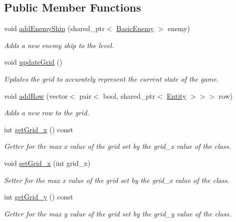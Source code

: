 \subsection*{Public Member Functions}
\begin{DoxyCompactItemize}
\item 
void \hyperlink{classGameLogic_1_1Level_a4d6e8cd499b0d78a36f7a2f89f221456}{add\+Enemy\+Ship} (shared\+\_\+ptr$<$ \hyperlink{classGameLogic_1_1BasicEnemy}{Basic\+Enemy} $>$ enemy)
\begin{DoxyCompactList}\small\item\em Adds a new enemy ship to the level. \end{DoxyCompactList}\item 
void \hyperlink{classGameLogic_1_1Level_a0d3d5db9311e281b7161c4daff692249}{update\+Grid} ()
\begin{DoxyCompactList}\small\item\em Updates the grid to accurately represent the current state of the game. \end{DoxyCompactList}\item 
void \hyperlink{classGameLogic_1_1Level_a42e42fda28e7f43286d9beb166d1e3f9}{add\+Row} (vector$<$ pair$<$ bool, shared\+\_\+ptr$<$ \hyperlink{classGameLogic_1_1Entity}{Entity} $>$$>$$>$ row)
\begin{DoxyCompactList}\small\item\em Adds a new row to the grid. \end{DoxyCompactList}\item 
int \hyperlink{classGameLogic_1_1Level_a3c233a241cf2ea7a231186acf2301ec3}{get\+Grid\+\_\+x} () const
\begin{DoxyCompactList}\small\item\em Getter for the max x value of the grid set by the grid\+\_\+x value of the class. \end{DoxyCompactList}\item 
void \hyperlink{classGameLogic_1_1Level_ac5f2066f82041e2222b79c427055f424}{set\+Grid\+\_\+x} (int grid\+\_\+x)
\begin{DoxyCompactList}\small\item\em Setter for the max x value of the grid set by the grid\+\_\+x value of the class. \end{DoxyCompactList}\item 
int \hyperlink{classGameLogic_1_1Level_a72e96cb117a1de175c2c91eb953f5b74}{get\+Grid\+\_\+y} () const
\begin{DoxyCompactList}\small\item\em Getter for the max y value of the grid set by the grid\+\_\+y value of the class. \end{DoxyCompactList}\item 

\end{DoxyCompactItemize}
